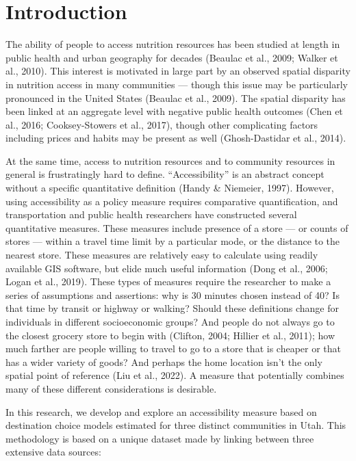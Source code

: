 \documentclass[
  letterpaper,
  number,
  review,
  3p]{elsarticle}
\begin{document}

\section{Introduction}\label{introduction}

The ability of people to access nutrition resources has been studied at
length in public health and urban geography for decades (Beaulac et al.,
2009; Walker et al., 2010). This interest is motivated in large part by
an observed spatial disparity in nutrition access in many communities
--- though this issue may be particularly pronounced in the United
States (Beaulac et al., 2009). The spatial disparity has been linked at
an aggregate level with negative public health outcomes (Chen et al.,
2016; Cooksey-Stowers et al., 2017), though other complicating factors
including prices and habits may be present as well (Ghosh-Dastidar et
al., 2014).

At the same time, access to nutrition resources and to community
resources in general is frustratingly hard to define. ``Accessibility''
is an abstract concept without a specific quantitative definition (Handy
\& Niemeier, 1997). However, using accessibility as a policy measure
requires comparative quantification, and transportation and public
health researchers have constructed several quantitative measures. These
measures include presence of a store --- or counts of stores --- within
a travel time limit by a particular mode, or the distance to the nearest
store. These measures are relatively easy to calculate using readily
available GIS software, but elide much useful information (Dong et al.,
2006; Logan et al., 2019). These types of measures require the
researcher to make a series of assumptions and assertions: why is 30
minutes chosen instead of 40? Is that time by transit or highway or
walking? Should these definitions change for individuals in different
socioeconomic groups? And people do not always go to the closest grocery
store to begin with (Clifton, 2004; Hillier et al., 2011); how much
farther are people willing to travel to go to a store that is cheaper or
that has a wider variety of goods? And perhaps the home location isn't
the only spatial point of reference (Liu et al., 2022). A measure that
potentially combines many of these different considerations is
desirable.

In this research, we develop and explore an accessibility measure based
on destination choice models estimated for three distinct communities in
Utah. This methodology is based on a unique dataset made by linking
between three extensive data sources:
\end{document}
